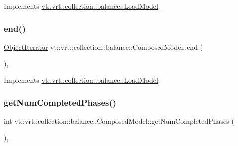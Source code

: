 Implements \hyperlink{classvt_1_1vrt_1_1collection_1_1balance_1_1_load_model_a6ca139b4f14d79d1d59b46016efae221}{vt\+::vrt\+::collection\+::balance\+::\+Load\+Model}.

\mbox{\label{classvt_1_1vrt_1_1collection_1_1balance_1_1_composed_model_a23ca95221c6bffb7417aafa2c939b40a}} 
\subsubsection{\texorpdfstring{end()}{end()}}
{\footnotesize\ttfamily \hyperlink{classvt_1_1vrt_1_1collection_1_1balance_1_1_object_iterator}{Object\+Iterator} vt\+::vrt\+::collection\+::balance\+::\+Composed\+Model\+::end (\begin{DoxyParamCaption}{ }\end{DoxyParamCaption})\hspace{0.3cm}{\ttfamily [override]}, {\ttfamily [virtual]}}



Implements \hyperlink{classvt_1_1vrt_1_1collection_1_1balance_1_1_load_model_a8474fb097bddbd75711e1e8d74084651}{vt\+::vrt\+::collection\+::balance\+::\+Load\+Model}.

\mbox{\label{classvt_1_1vrt_1_1collection_1_1balance_1_1_composed_model_a20736b80cf2b19d1a9352363b48039e0}} 
\subsubsection{\texorpdfstring{get\+Num\+Completed\+Phases()}{getNumCompletedPhases()}}
{\footnotesize\ttfamily int vt\+::vrt\+::collection\+::balance\+::\+Composed\+Model\+::get\+Num\+Completed\+Phases (\begin{DoxyParamCaption}{ }\end{DoxyParamCaption})\hspace{0.3cm}{\ttfamily [override]}, {\ttfamily [virtual]}}



